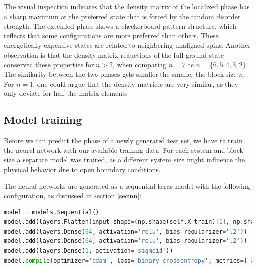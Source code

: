 \documentclass[reprint,amsmath,amssymb,aps,prb]{revtex4-2}
\begin{document}
\twocolumngrid\newpage
The visual inspection indicates that the density matrix of the localized phase has a sharp maximum at the preferred state that is forced by the random disorder strength. The extended phase shows a checkerboard pattern structure, which reflects that some configurations are more preferred than others. These energetically expensive states are related to neighboring unaligned spins. Another observation is that the density matrix reductions of the full ground state conserved these properties for $n>2$, when comparing $n=7$ to $n=\{6,5,4,3,2\}$. The similarity between the two phases gets smaller the smaller the block size $n$. For $n=1$, one could argue that the density matrices are very similar, as they only deviate for half the matrix elements.



\subsection{Model training}\label{sec:loss_acc}

Before we can predict the phase of a newly generated test set, we have to train the neural network with our available training data. For each system and block size a separate model was trained, as a different system size might influence the physical behavior due to open boundary conditions.

The neural networks are generated as a sequential keras model with the following configuration, as discussed in section \ref{sec:nn}: 

\begin{lstlisting}[language=Python]
model = models.Sequential()
model.add(layers.Flatten(input_shape=(np.shape(self.X_train)[1], np.shape(self.X_train)[1], 2)))
model.add(layers.Dense(64, activation='relu', bias_regularizer='l2'))
model.add(layers.Dense(64, activation='relu', bias_regularizer='l2'))
model.add(layers.Dense(1, activation='sigmoid'))
model.compile(optimizer='adam', loss='binary_crossentropy', metrics=['accuracy'])
\end{lstlisting}
\end{document}
